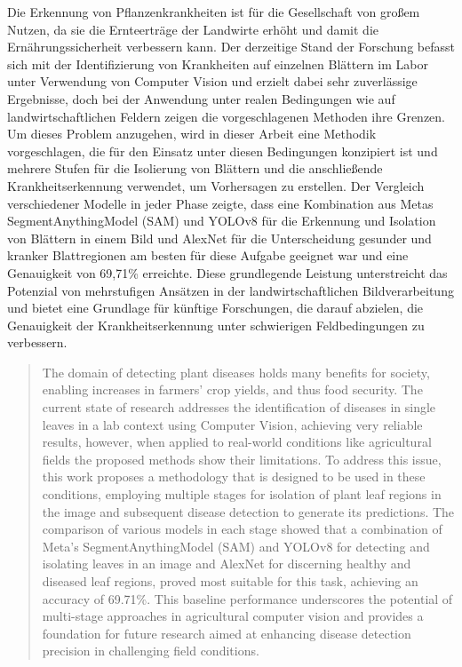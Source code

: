 \documentclass[draft,final]{vutinfth} %
\begin{document}
\begin{kurzfassung}
Die Erkennung von Pflanzenkrankheiten ist für die Gesellschaft von großem Nutzen, da sie die Ernteerträge der Landwirte erhöht und damit die Ernährungssicherheit verbessern kann. Der derzeitige Stand der Forschung befasst sich mit der Identifizierung von Krankheiten auf einzelnen Blättern im Labor unter Verwendung von Computer Vision und erzielt dabei sehr zuverlässige Ergebnisse, doch bei der Anwendung unter realen Bedingungen wie auf landwirtschaftlichen Feldern zeigen die vorgeschlagenen Methoden ihre Grenzen. Um dieses Problem anzugehen, wird in dieser Arbeit eine Methodik vorgeschlagen, die für den Einsatz unter diesen Bedingungen konzipiert ist und mehrere Stufen für die Isolierung von Blättern und die anschließende Krankheitserkennung verwendet, um Vorhersagen zu erstellen. Der Vergleich verschiedener Modelle in jeder Phase zeigte, dass eine Kombination aus Metas SegmentAnythingModel (SAM) und YOLOv8 für die Erkennung und Isolation von Blättern in einem Bild und AlexNet für die Unterscheidung gesunder und kranker Blattregionen am besten für diese Aufgabe geeignet war und eine Genauigkeit von 69,71\% erreichte. Diese grundlegende Leistung unterstreicht das Potenzial von mehrstufigen Ansätzen in der landwirtschaftlichen Bildverarbeitung und bietet eine Grundlage für künftige Forschungen, die darauf abzielen, die Genauigkeit der Krankheitserkennung unter schwierigen Feldbedingungen zu verbessern.
\end{kurzfassung}

\begin{abstract}
The domain of detecting plant diseases holds many benefits for society, enabling increases in farmers' crop yields, and thus food security. The current state of research addresses the identification of diseases in single leaves in a lab context using Computer Vision, achieving very reliable results, however, when applied to real-world conditions like agricultural fields the proposed methods show their limitations. To address this issue, this work proposes a methodology that is designed to be used in these conditions, employing multiple stages for isolation of plant leaf regions in the image and subsequent disease detection to generate its predictions. The comparison of various models in each stage showed that a combination of Meta's SegmentAnythingModel (SAM) and YOLOv8 for detecting and isolating leaves in an image and AlexNet for discerning healthy and diseased leaf regions, proved most suitable for this task, achieving an accuracy of 69.71\%. This baseline performance underscores the potential of multi-stage approaches in agricultural computer vision and provides a foundation for future research aimed at enhancing disease detection precision in challenging field conditions.
\end{abstract}
\end{document}
